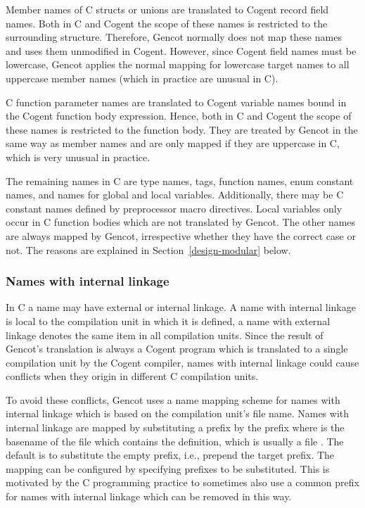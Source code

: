 Member names of C structs or unions are translated to Cogent record field names. Both in C and Cogent the scope of these
names is restricted to the surrounding structure. Therefore, Gencot normally does not map these names and uses them unmodified
in Cogent. However, since Cogent field names must be lowercase, Gencot applies the normal mapping for lowercase target 
names to all uppercase member names (which in practice are unusual in C). 

C function parameter names are translated to Cogent variable names bound in the Cogent function body expression. Hence, both
in C and Cogent the scope of these names is restricted to the function body. They are treated by Gencot in the same way as 
member names and are only mapped if they are uppercase in C, which is very unusual in practice.

The remaining names in C are type names, tags, function names, enum constant names, and names for global and local variables.
Additionally, there may be C constant names defined by preprocessor macro directives.
Local variables only occur in C function bodies which are not translated by Gencot. The other names are always mapped by
Gencot, irrespective whether they have the correct case or not. The reasons are explained in Section~\ref{design-modular}
below.

\subsubsection{Names with internal linkage}

In C a name may have external or internal linkage. A name with internal linkage is local to the compilation unit in which it
is defined, a name with external linkage denotes the same item in all compilation units. Since the result of Gencot's 
translation is always a Cogent program which is translated to a single compilation unit by the Cogent compiler, names 
with internal linkage could cause conflicts when they origin in different C compilation units.

To avoid these conflicts, Gencot uses a name mapping scheme for names with internal linkage which is based on the 
compilation unit's file name. Names with internal linkage are mapped by substituting a prefix by the prefix 
where  is the basename of the file which contains the definition, which is usually a file . The default
is to substitute the empty prefix, i.e., prepend the target prefix. The mapping can be configured by specifying prefixes
to be substituted. This is motivated by the C programming practice to sometimes also use a common prefix for names 
with internal linkage which can be removed in this way.

